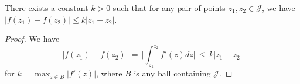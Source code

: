 




\begin{lemma}
\label{expansion factor}
There exists a constant $k>0$ such that for any pair of points $z_1, z_2 \in \mathcal J$, we have 
$|f(z_1)-f(z_2)| \leq k|z_1-z_2|$.
\end{lemma}

\begin{proof}
	We have 
	\begin{equation}
		|f(z_1)-f(z_2)| \, = \,  \biggl | \int_{z_1} ^{z_2} f'(z) dz \biggr | 
  \, \leq \, k|z_1-z_2|	
	\end{equation}
for $k=\max_{z \in B} |f'(z)|$, where $B$ is any ball containing $\mathcal J$. 
\end{proof}

